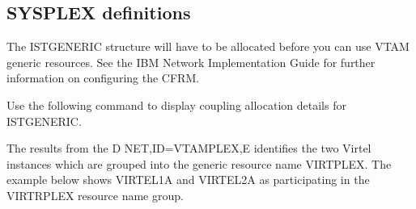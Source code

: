 \documentclass[letterpaper,10pt,english]{sphinxmanual}
\begin{document}
\subsection{SYSPLEX definitions}
\label{\detokenize{connectivity_guide:sysplex-definitions}}\label{\detokenize{connectivity_guide:index-177}}
\sphinxAtStartPar
The ISTGENERIC structure will have to be allocated before you can use VTAM generic resources. See the IBM Network Implementation Guide for further information on configuring the CFRM.

\sphinxAtStartPar
Use the following command to display coupling allocation details for ISTGENERIC.

\begin{sphinxVerbatim}[commandchars=\\\{\}]
 
\end{sphinxVerbatim}

\sphinxAtStartPar
{}

\sphinxAtStartPar
The results from the D NET,ID=VTAMPLEX,E identifies the two Virtel instances which are grouped into the generic resource name VIRTPLEX. The example below shows VIRTEL1A and VIRTEL2A as participating in the VIRTRPLEX resource name group.

\begin{sphinxVerbatim}[commandchars=\\\{\}]
 

  
        
      
    
    
      
         
      
 
\end{sphinxVerbatim}
\end{document}
